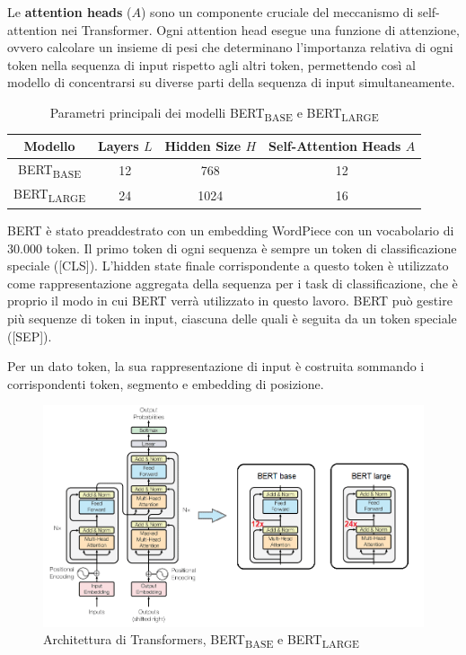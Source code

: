 \documentclass[../../Thesis.tex]{subfiles}
\begin{document}
Le \textbf{attention heads} ($A$) sono un componente cruciale del meccanismo di self-attention nei Transformer. Ogni attention head esegue una funzione di attenzione, ovvero calcolare un insieme di pesi che determinano l'importanza relativa di ogni token nella sequenza di input rispetto agli altri token, permettendo così al modello di concentrarsi su diverse parti della sequenza di input simultaneamente. 

\begin{table}[h]
    \centering
    \begin{tabular}{|c|c|c|c|}
        \hline
        Modello & Layers $L$ & Hidden Size $H$ & Self-Attention Heads $A$ \\
        \hline
        BERT\textsubscript{BASE} & 12 & 768 & 12 \\
        \hline
        BERT\textsubscript{LARGE} & 24 & 1024 & 16 \\
        \hline
    \end{tabular}
    \caption{Parametri principali dei modelli BERT\textsubscript{BASE} e BERT\textsubscript{LARGE}}
    \label{tab:bert_params}
\end{table}

BERT è stato preaddestrato con un embedding WordPiece \cite{WordPiece} con un vocabolario di 30.000 token. Il primo token di ogni sequenza è sempre un token di classificazione speciale ([CLS]). L'hidden state finale corrispondente a questo token è utilizzato come rappresentazione aggregata della sequenza per i task di classificazione, che è proprio il modo in cui BERT verrà utilizzato in questo lavoro. BERT può gestire più sequenze di token in input, ciascuna delle quali è seguita da un token speciale ([SEP]).

Per un dato token, la sua rappresentazione di input è costruita sommando i corrispondenti token, segmento e embedding di posizione.

\begin{figure}[h]
    \centering
    \includegraphics[width=\textwidth]{img/bert_base_large.jpg}
    \caption{Architettura di Transformers, BERT\textsubscript{BASE} e BERT\textsubscript{LARGE}}
    \label{fig:bert_input}
\end{figure}
\end{document}
